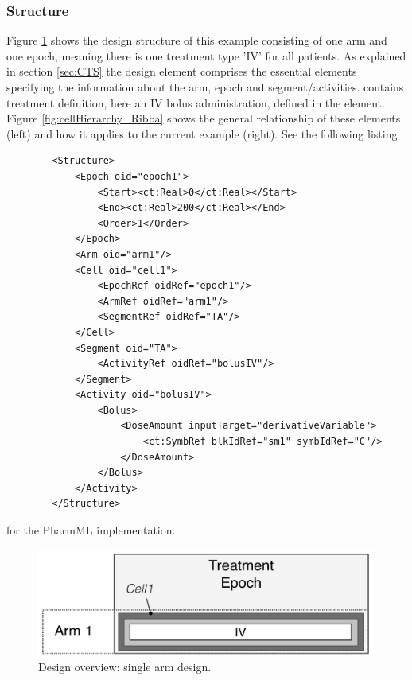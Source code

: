 \subsubsection{Structure}
Figure \ref{fig:1Arm1Epoch_RibbaDesign} shows the design structure of this example 
consisting of one arm and one epoch, meaning there is one treatment type 'IV' for all patients. 
As explained in section \ref{sec:CTS} the design element  comprises the 
essential elements specifying the information about the arm, epoch and segment/activities. 
 contains treatment definition, here an IV bolus administration, 
defined in the  element. Figure \ref{fig:cellHierarchy_Ribba} shows 
the general relationship of these elements (left) and how it applies to the current example (right).
See the following listing 
\lstset{language=XML}
\begin{lstlisting}
        <Structure>
            <Epoch oid="epoch1">
                <Start><ct:Real>0</ct:Real></Start>
                <End><ct:Real>200</ct:Real></End>
                <Order>1</Order>
            </Epoch>
            <Arm oid="arm1"/>
            <Cell oid="cell1">
                <EpochRef oidRef="epoch1"/>
                <ArmRef oidRef="arm1"/>
                <SegmentRef oidRef="TA"/>
            </Cell>
            <Segment oid="TA">
                <ActivityRef oidRef="bolusIV"/>
            </Segment>
            <Activity oid="bolusIV">
                <Bolus>
                    <DoseAmount inputTarget="derivativeVariable">
                        <ct:SymbRef blkIdRef="sm1" symbIdRef="C"/>
                    </DoseAmount>
                </Bolus>
            </Activity>
        </Structure> 
\end{lstlisting}
for the PharmML implementation.

\begin{figure}[ht!]
\centering
\includegraphics[width=0.7\linewidth]{pics/OneArmOneEpoch_IV}
\caption{Design overview: single arm design.}
\label{fig:1Arm1Epoch_RibbaDesign}
\end{figure}

